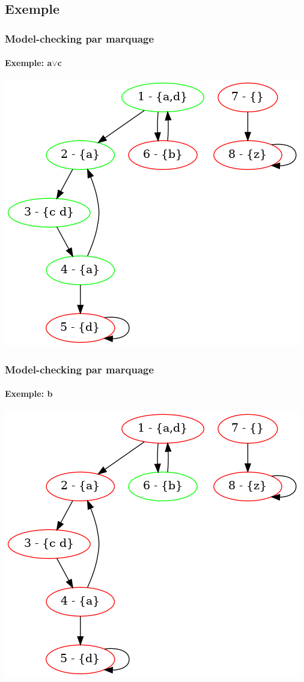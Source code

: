 \documentclass[11pt]{beamer}
\begin{document}
\subsection{Exemple}
\begin{frame}
    \frametitle{Model-checking par marquage}
    \framesubtitle{Exemple: a$\lor$c}

    \includegraphics[scale=0.4]{imgs/marquage1.png}
\end{frame}

\begin{frame}
    \frametitle{Model-checking par marquage}
    \framesubtitle{Exemple: b}

    \includegraphics[scale=0.4]{imgs/marquage2.png}
\end{frame}
\end{document}
